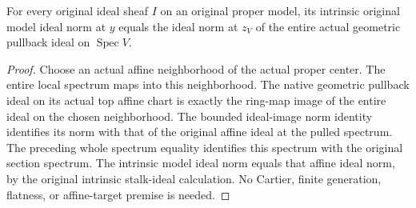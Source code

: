 \begin{lemma}
\label{lem:actual-model-ideal-center-pullback-norm}
\leanok
{}
For every original ideal sheaf $I$ on an original proper model, its
intrinsic original model ideal norm at $y$ equals the ideal norm at
$z_V$ of the entire actual geometric pullback ideal on
$\operatorname{Spec}V$.
\end{lemma}
\begin{proof}
Choose an actual affine neighborhood of the actual proper center.
The entire local spectrum maps into this neighborhood. The native
geometric pullback ideal on its actual top affine chart is exactly
the ring-map image of the entire ideal on the chosen neighborhood.
The bounded ideal-image norm identity identifies its norm with that
of the original affine ideal at the pulled spectrum. The preceding
whole spectrum equality identifies this spectrum with the original
section spectrum. The intrinsic model ideal norm equals that affine
ideal norm, by the original intrinsic stalk-ideal calculation. No
Cartier, finite generation, flatness, or affine-target premise is
needed.
\end{proof}
